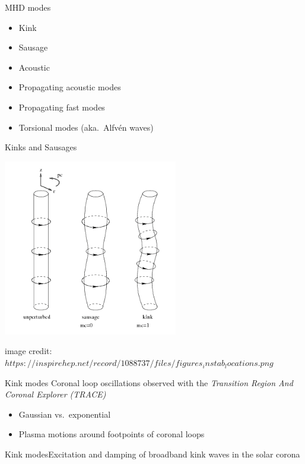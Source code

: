 \documentclass[table]{beamer}
\begin{document}
\begin{frame}{MHD modes}
    \begin{itemize}
        \item Kink
        \item Sausage
        \item Acoustic
        \item Propagating acoustic modes
        \item Propagating fast modes
        \item Torsional modes (aka.\ Alfv\'en waves)
    \end{itemize}
\end{frame}%
\begin{frame}{Kinks and Sausages}
    \begin{center}
    \includegraphics[width=3in]{kink_saus.png}
    \par{\tiny image credit:
    $https://inspirehep.net/record/1088737/files/figures_instab_locations.png$}
    \end{center}
\end{frame}%
\begin{frame}{Kink modes}
{Coronal loop oscillations observed with the
\emph{Transition Region And Coronal Explorer (TRACE)}}
    \begin{itemize}
        \item Gaussian vs.\ exponential
        \item Plasma motions around footpoints of coronal loops
    \end{itemize}
\end{frame}%
\begin{frame}{Kink modes}{Excitation and damping of broadband kink waves
    in the solar corona}
\end{frame}%
\end{document}
